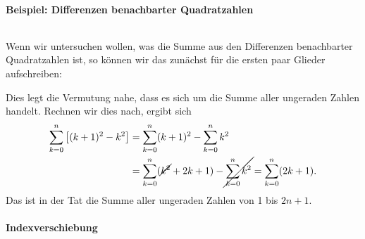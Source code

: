 \clearpage
\paragraph{Beispiel: Differenzen benachbarter Quadratzahlen}$~$

Wenn wir untersuchen wollen, was die Summe aus den Differenzen benachbarter Quadratzahlen ist, so können wir das zunächst für die ersten paar Glieder aufschreiben: 
\begin{figure}[htp]
    \centering
\end{figure}
Dies legt die Vermutung nahe, dass es sich um die Summe aller ungeraden Zahlen handelt. Rechnen wir dies nach, ergibt sich 
\begin{align}
    \sum_{k=0}^n \qty[(k+1)^2 - k^2] &= \sum_{k=0}^n (k+1)^2 - \sum_{k=0}^n k^2 \notag \\   
    &= \sum_{k=0}^n (\cancel{k^2} +2k +1) - \cancel{\sum_{k=0}^n k^2} = \sum_{k=0}^n (2k+1).
\end{align}
Das ist in der Tat die Summe aller ungeraden Zahlen von 1 bis $2n+1$.

\paragraph{Indexverschiebung}$~$

